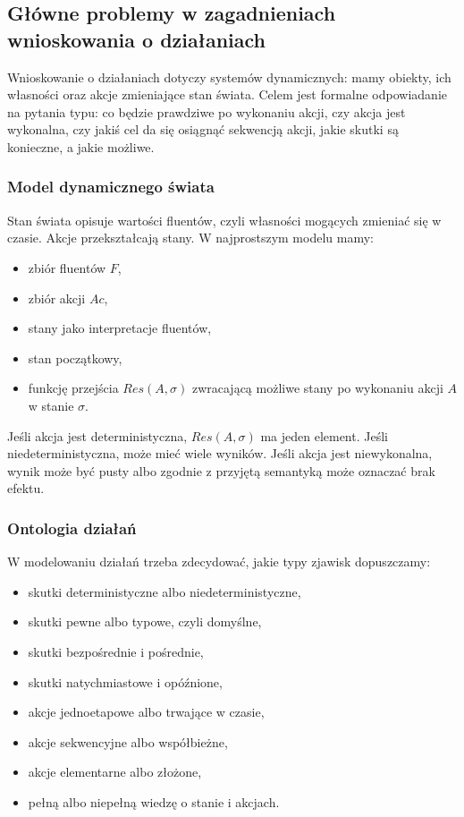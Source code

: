 \subsection{Główne problemy w zagadnieniach wnioskowania o działaniach}

Wnioskowanie o działaniach dotyczy systemów dynamicznych: mamy obiekty, ich własności oraz akcje zmieniające stan świata. Celem jest formalne odpowiadanie na pytania typu: co będzie prawdziwe po wykonaniu akcji, czy akcja jest wykonalna, czy jakiś cel da się osiągnąć sekwencją akcji, jakie skutki są konieczne, a jakie możliwe.

\subsubsection{Model dynamicznego świata}

Stan świata opisuje wartości fluentów, czyli własności mogących zmieniać się w czasie. Akcje przekształcają stany. W najprostszym modelu mamy:
\begin{itemize}
  \item zbiór fluentów $F$,
  \item zbiór akcji $Ac$,
  \item stany jako interpretacje fluentów,
  \item stan początkowy,
  \item funkcję przejścia $Res(A,\sigma)$ zwracającą możliwe stany po wykonaniu akcji $A$ w stanie $\sigma$.
\end{itemize}

Jeśli akcja jest deterministyczna, $Res(A,\sigma)$ ma jeden element. Jeśli niedeterministyczna, może mieć wiele wyników. Jeśli akcja jest niewykonalna, wynik może być pusty albo zgodnie z przyjętą semantyką może oznaczać brak efektu.

\subsubsection{Ontologia działań}

W modelowaniu działań trzeba zdecydować, jakie typy zjawisk dopuszczamy:
\begin{itemize}
  \item skutki deterministyczne albo niedeterministyczne,
  \item skutki pewne albo typowe, czyli domyślne,
  \item skutki bezpośrednie i pośrednie,
  \item skutki natychmiastowe i opóźnione,
  \item akcje jednoetapowe albo trwające w czasie,
  \item akcje sekwencyjne albo współbieżne,
  \item akcje elementarne albo złożone,
  \item pełną albo niepełną wiedzę o stanie i akcjach.
\end{itemize}

